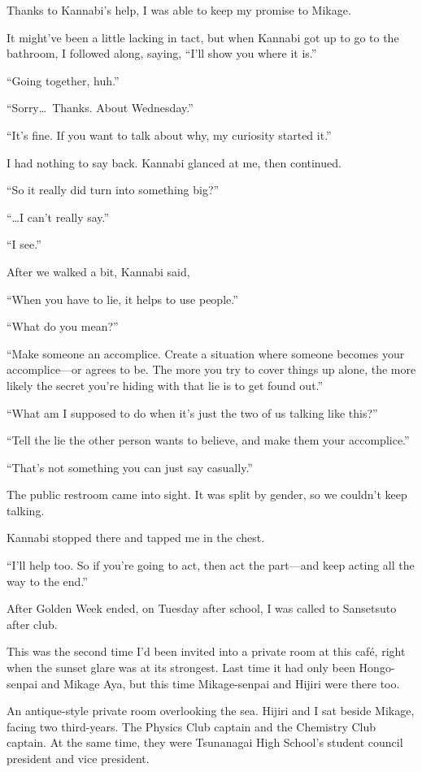 \documentclass[
    a4paper,
    12pt,
    twoside,
    openany,
    UTF8,
    fontset=windows
]{ctexbook}
\begin{document}
Thanks to Kannabi's help, I was able to keep my promise to Mikage.

It might've been a little lacking in tact, but when Kannabi got up to go to the bathroom, I followed along, saying, ``I'll show you where it is.''

``Going together, huh.''

``Sorry\dots\ Thanks. About Wednesday.''

``It's fine. If you want to talk about why, my curiosity started it.''

I had nothing to say back. Kannabi glanced at me, then continued.

``So it really did turn into something big?''

``\dots I can't really say.''

``I see.''

After we walked a bit, Kannabi said,

``When you have to lie, it helps to use people.''

``What do you mean?''

``Make someone an accomplice. Create a situation where someone becomes your accomplice---or agrees to be. The more you try to cover things up alone, the more likely the secret you're hiding with that lie is to get found out.''

``What am I supposed to do when it's just the two of us talking like this?''

``Tell the lie the other person wants to believe, and make them your accomplice.''

``That's not something you can just say casually.''

The public restroom came into sight. It was split by gender, so we couldn't keep talking.

Kannabi stopped there and tapped me in the chest.

``I'll help too. So if you're going to act, then act the part---and keep acting all the way to the end.''

After Golden Week ended, on Tuesday after school, I was called to Sansetsuto after club.

This was the second time I'd been invited into a private room at this café, right when the sunset glare was at its strongest. Last time it had only been Hongo-senpai and Mikage Aya, but this time Mikage-senpai and Hijiri were there too.

An antique-style private room overlooking the sea. Hijiri and I sat beside Mikage, facing two third-years. The Physics Club captain and the Chemistry Club captain. At the same time, they were Tsunanagai High School's student council president and vice president.
\end{document}
